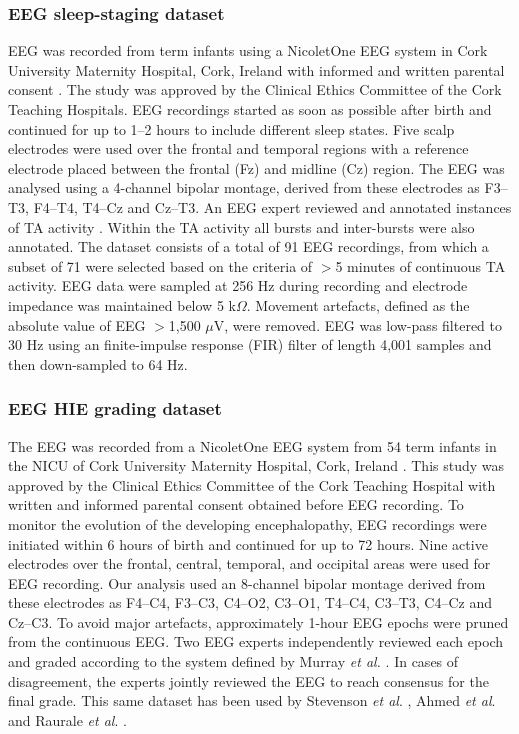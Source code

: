 \documentclass[conference]{IEEEtran}
\begin{document}
\subsubsection{EEG sleep-staging dataset}
EEG was recorded from term infants using a NicoletOne EEG system in Cork University Maternity Hospital, Cork, Ireland with informed and written parental consent \cite{Korotchikova1}. The study was approved by the Clinical Ethics Committee of the Cork Teaching Hospitals. EEG recordings started as soon as possible after birth and continued for up to 1--2 hours to include different sleep states. Five scalp electrodes were used over the frontal and temporal regions with a reference electrode placed between the frontal (Fz) and midline (Cz) region. The EEG was analysed using a 4-channel bipolar montage, derived from these electrodes as F3–T3, F4–T4, T4–Cz and Cz–T3. 
An EEG expert reviewed and annotated instances of TA activity \cite{Korotchikova1}. 
Within the TA activity all bursts and inter-bursts were also annotated.
The dataset consists of a total of 91 EEG recordings, from which a subset of 71 were selected based on the criteria of $>$5 minutes of continuous TA activity. 
EEG data were sampled at 256 Hz during recording and electrode impedance was maintained below 5 k$\Omega$. Movement artefacts, defined as the absolute value of EEG $>$1,500 $\mu$V, were removed. EEG was low-pass filtered to 30 Hz using an finite-impulse response (FIR) filter of length 4,001 samples and then down-sampled to 64 Hz.

\subsubsection{EEG HIE grading dataset}
The EEG was recorded from a NicoletOne EEG system from 54 term infants in the NICU of Cork University Maternity Hospital, Cork, Ireland \cite{R11}. This study was approved by the Clinical Ethics Committee of the Cork Teaching Hospital with written and informed parental consent obtained before EEG recording. To monitor the evolution of the developing encephalopathy, EEG recordings were initiated within 6 hours of birth and continued for up to 72 hours. Nine active electrodes over the frontal, central, temporal, and occipital areas were used for EEG recording. Our analysis used an 8-channel bipolar montage derived from these electrodes as F4–C4, F3–C3, C4–O2, C3–O1, T4–C4, C3–T3, C4–Cz and Cz–C3. To avoid major artefacts, approximately 1-hour EEG epochs were pruned from the continuous EEG. Two EEG experts independently reviewed each epoch and graded according to the system defined by Murray \emph{et al.} \cite{murray}. In cases of disagreement, the experts jointly reviewed the EEG to reach consensus for the final grade. This same dataset has been used by Stevenson \emph{et al}. \cite{R11}, Ahmed \emph{et al}. \cite{R12} and Raurale \emph{et al}. \cite{R13,raurale2020cnn,jne}.
\end{document}
